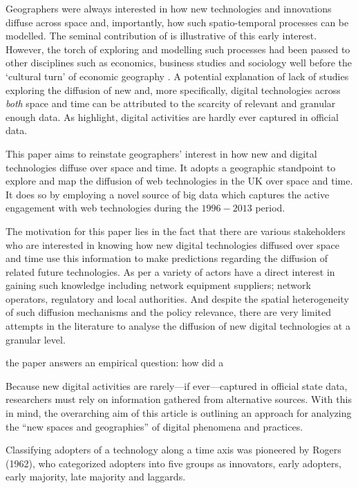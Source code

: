 \documentclass[preprint, 3p,
authoryear]{elsarticle} %
\begin{document}
Geographers were always interested in how new technologies and
innovations diffuse across space and, importantly, how such
spatio-temporal processes can be modelled. The seminal contribution of
\citet{hagerstrand1968innovation} is illustrative of this early
interest. However, the torch of exploring and modelling such processes
had been passed to other disciplines such as economics, business studies
and sociology well before the `cultural turn' of economic geography
\citep{perkins2005international}. A potential explanation of lack of
studies exploring the diffusion of new and, more specifically, digital
technologies across \emph{both} space and time can be attributed to the
scarcity of relevant and granular enough data. As
\citet{zook2022mapping} highlight, digital activities are hardly ever
captured in official data.

This paper aims to reinstate geographers' interest in how new and
digital technologies diffuse over space and time. It adopts a geographic
standpoint to explore and map the diffusion of web technologies in the
UK over space and time. It does so by employing a novel source of big
data which captures the active engagement with web technologies during
the \(1996-2013\) period.

The motivation for this paper lies in the fact that there are various
stakeholders who are interested in knowing how new digital technologies
diffused over space and time use this information to make predictions
regarding the diffusion of related future technologies. As per
\citet{meade2021modelling} a variety of actors have a direct interest in
gaining such knowledge including network equipment suppliers; network
operators, regulatory and local authorities. And despite the spatial
heterogeneity of such diffusion mechanisms and the policy relevance,
there are very limited attempts in the literature to analyse the
diffusion of new digital technologies at a granular level.

the paper answers an empirical question: how did a

\citet{zook2022mapping} Because new digital activities are rarely---if
ever---captured in official state data, researchers must rely on
information gathered from alternative sources. With this in mind, the
overarching aim of this article is outlining an approach for analyzing
the ``new spaces and geographies'' of digital phenomena and practices.

Classifying adopters of a technology along a time axis was pioneered by
Rogers (1962), who categorized adopters into five groups as innovators,
early adopters, early majority, late majority and laggards.
\end{document}
